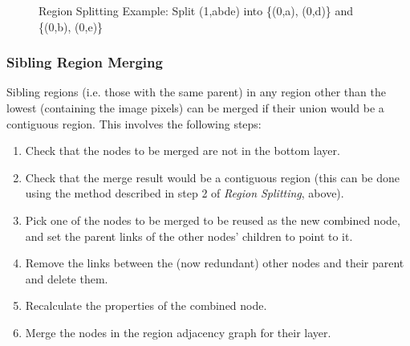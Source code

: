\begin{figure}[ht]
\begin{center}
	\hspace{4mm}%
	\hspace{4mm}%
\end{center}
\caption{Region Splitting Example: Split (1,abde) into \{(0,a), (0,d)\} and \{(0,b), (0,e)\}}
\label{fig:ipfs-regionsplitting}
\end{figure}

\subsubsection{Sibling Region Merging}

Sibling regions (i.e. those with the same parent) in any region other than the lowest (containing the image pixels) can be merged if their union would be a contiguous region. This involves the following steps:

\begin{enumerate}

\item Check that the nodes to be merged are not in the bottom layer.
\item Check that the merge result would be a contiguous region (this can be done using the method described in step 2 of \emph{Region Splitting}, above).
\item Pick one of the nodes to be merged to be reused as the new combined node, and set the parent links of the other nodes' children to point to it.
\item Remove the links between the (now redundant) other nodes and their parent and delete them.
\item Recalculate the properties of the combined node.
\item Merge the nodes in the region adjacency graph for their layer.

\end{enumerate}


